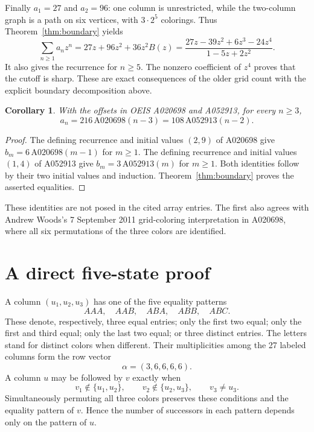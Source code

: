 \documentclass[11pt,a4paper]{article}
\newtheorem{corollary}[theorem]{Corollary}
\begin{document}
Finally \(a_1=27\) and \(a_2=96\): one column is unrestricted, while
the two-column graph is a path on six vertices, with \(3\cdot2^5\)
colorings. Thus Theorem~\ref{thm:boundary} yields
\[
 \sum_{n\ge1}a_nz^n=27z+96z^2+36z^2B(z)
 =\frac{27z-39z^2+6z^3-24z^4}{1-5z+2z^2}.
\]
It also gives the recurrence for \(n\ge5\). The nonzero coefficient
of \(z^4\) proves that the cutoff is sharp. These are exact consequences
of the older grid count with the explicit boundary decomposition above.

\begin{corollary}\label{cor:oeis}
With the offsets in OEIS A020698 and A052913, for every \(n\ge3\),
\[
 a_n=216\,\mathrm{A020698}(n-3)
     =108\,\mathrm{A052913}(n-2).
\]
\end{corollary}
\begin{proof}
The defining recurrence and initial values \((2,9)\) of A020698
\cite{related-one} give \(b_m=6\,\mathrm{A020698}(m-1)\) for \(m\ge1\).
The defining recurrence and initial values \((1,4)\) of A052913
\cite{related-two} give \(b_m=3\,\mathrm{A052913}(m)\) for \(m\ge1\).
Both identities follow by their two initial values and induction.
Theorem~\ref{thm:boundary} proves the asserted equalities.
\end{proof}
These identities are not posed in the cited array entries. The first
also agrees with Andrew Woods's 7 September 2011 grid-coloring
interpretation in A020698, where all six permutations of the three
colors are identified.

\section{A direct five-state proof}

A column \((u_1,u_2,u_3)\) has one of the five equality patterns
\[
 AAA,\quad AAB,\quad ABA,\quad ABB,\quad ABC.
\]
These denote, respectively, three equal entries; only the first two equal;
only the first and third equal; only the last two equal; or three distinct
entries. The letters stand for distinct colors when different.
Their multiplicities among the 27 labeled columns form the row vector
\[
 \alpha=(3,6,6,6,6).
\]
A column \(u\) may be followed by \(v\) exactly when
\begin{equation}\label{eq:transition}
 v_1\notin\{u_1,u_2\},\qquad
 v_2\notin\{u_2,u_3\},\qquad v_3\ne u_3.
\end{equation}
Simultaneously permuting all three colors preserves these conditions and
the equality pattern of \(v\). Hence the number of successors in each
pattern depends only on the pattern of \(u\).
\end{document}
